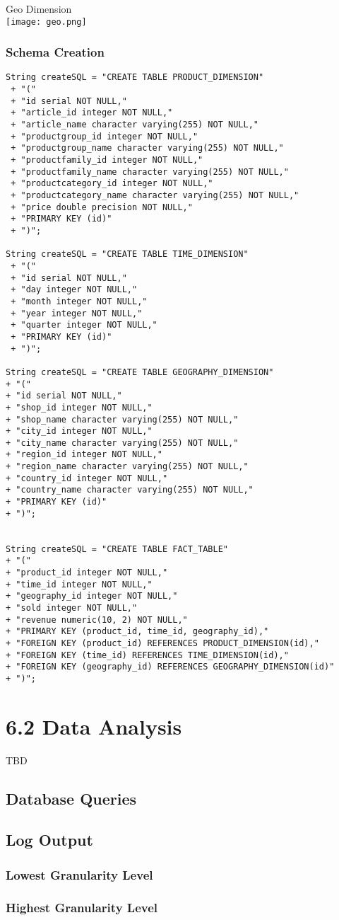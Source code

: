 \documentclass[ngerman]{dis-template-add}
\begin{document}
Geo Dimension \\
\texttt{[image: geo.png]}



\subsubsection*{Schema Creation}

\begin{verbatim}
String createSQL = "CREATE TABLE PRODUCT_DIMENSION"
 + "("
 + "id serial NOT NULL,"
 + "article_id integer NOT NULL,"
 + "article_name character varying(255) NOT NULL,"
 + "productgroup_id integer NOT NULL,"
 + "productgroup_name character varying(255) NOT NULL,"
 + "productfamily_id integer NOT NULL,"
 + "productfamily_name character varying(255) NOT NULL,"
 + "productcategory_id integer NOT NULL,"
 + "productcategory_name character varying(255) NOT NULL,"
 + "price double precision NOT NULL,"
 + "PRIMARY KEY (id)"
 + ")";
                
String createSQL = "CREATE TABLE TIME_DIMENSION"
 + "("
 + "id serial NOT NULL,"
 + "day integer NOT NULL,"
 + "month integer NOT NULL,"
 + "year integer NOT NULL,"
 + "quarter integer NOT NULL,"
 + "PRIMARY KEY (id)"
 + ")";
                
String createSQL = "CREATE TABLE GEOGRAPHY_DIMENSION"
+ "("
+ "id serial NOT NULL,"
+ "shop_id integer NOT NULL,"
+ "shop_name character varying(255) NOT NULL,"
+ "city_id integer NOT NULL,"
+ "city_name character varying(255) NOT NULL,"
+ "region_id integer NOT NULL,"
+ "region_name character varying(255) NOT NULL,"
+ "country_id integer NOT NULL,"
+ "country_name character varying(255) NOT NULL,"
+ "PRIMARY KEY (id)"
+ ")";
                
                
String createSQL = "CREATE TABLE FACT_TABLE"
+ "("
+ "product_id integer NOT NULL,"
+ "time_id integer NOT NULL,"
+ "geography_id integer NOT NULL,"
+ "sold integer NOT NULL,"
+ "revenue numeric(10, 2) NOT NULL,"
+ "PRIMARY KEY (product_id, time_id, geography_id),"
+ "FOREIGN KEY (product_id) REFERENCES PRODUCT_DIMENSION(id),"
+ "FOREIGN KEY (time_id) REFERENCES TIME_DIMENSION(id),"
+ "FOREIGN KEY (geography_id) REFERENCES GEOGRAPHY_DIMENSION(id)"
+ ")";
\end{verbatim}


\section*{6.2 Data Analysis}

TBD

\subsection*{Database Queries}

\subsection*{Log Output}

\subsubsection*{Lowest Granularity Level}

\subsubsection*{Highest Granularity Level}
\end{document}
